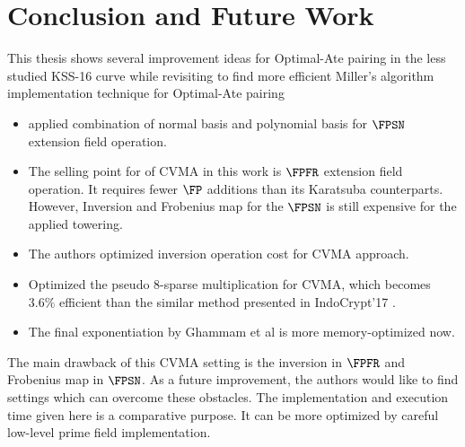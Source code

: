\section{Conclusion and Future Work}\label{sec:5}
This thesis shows several improvement ideas for Optimal-Ate pairing in the less studied KSS-16 curve while revisiting \cite{INDOCRYPT:KNGDNK17} to find more efficient Miller's algorithm implementation technique for Optimal-Ate pairing
\begin{itemize}
	\item applied combination of normal basis  and polynomial basis for $\FPSN$ extension field operation.
\item	The selling point for of CVMA in this work is $\FPFR$ extension field operation. 
	It requires fewer $\FP$ additions than its Karatsuba counterparts. 
	However, Inversion and Frobenius map for the $\FPSN$ is still expensive for the applied towering.
	\item The authors optimized inversion operation cost for CVMA approach.
	\item  Optimized the pseudo 8-sparse multiplication for CVMA, which becomes $3.6\%$ efficient than the similar method presented in IndoCrypt'17 \cite{INDOCRYPT:KNGDNK17}.
	\item  The final exponentiation by Ghammam et al \cite{EPRINT:GhaFou16b} is more memory-optimized now. 
\end{itemize}
The main drawback of this CVMA setting is the inversion in $\FPFR$ and Frobenius map in $\FPSN$.
As a future improvement, the authors would like to find settings which can overcome these obstacles. 
The implementation and execution time given here is a comparative purpose. It can be more optimized by careful low-level prime field implementation.

